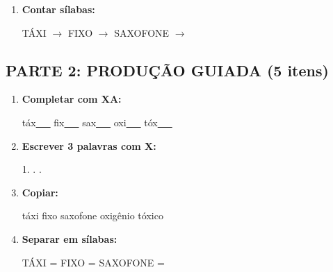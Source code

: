 \begin{exercicio}
\begin{enumerate}
  \item \textbf{Contar sílabas:}
  \begin{center}
  TÁXI $\rightarrow$ \underline{\hspace{0.9cm}} \quad FIXO $\rightarrow$ \underline{\hspace{0.9cm}} \quad SAXOFONE $\rightarrow$ \underline{\hspace{0.9cm}}
  \end{center}

\end{enumerate}

\subsection*{PARTE 2: PRODUÇÃO GUIADA (5 itens)}

\begin{enumerate}[resume]

  \item \textbf{Completar com XA:}
  \begin{center}
  táx\underline{~~~} \quad fix\underline{~~~} \quad sax\underline{~~~} \quad oxi\underline{~~~} \quad tóx\underline{~~~}
  \end{center}

  \item \textbf{Escrever 3 palavras com X:}
  \begin{center}
  1. \underline{\hspace{3cm}} . \underline{\hspace{3cm}} . \underline{\hspace{3cm}}
  \end{center}

  \item \textbf{Copiar:}
  \begin{center}
  táxi \quad fixo \quad saxofone \quad oxigênio \quad tóxico
  \end{center}

  \item \textbf{Separar em sílabas:}
  \begin{center}
  TÁXI = \underline{\hspace{1cm}} \underline{\hspace{1cm}} \quad FIXO = \underline{\hspace{1cm}} \underline{\hspace{1cm}} \quad SAXOFONE = \underline{\hspace{1cm}} \underline{\hspace{1cm}}
  \end{center}


\end{enumerate}
\end{exercicio}
